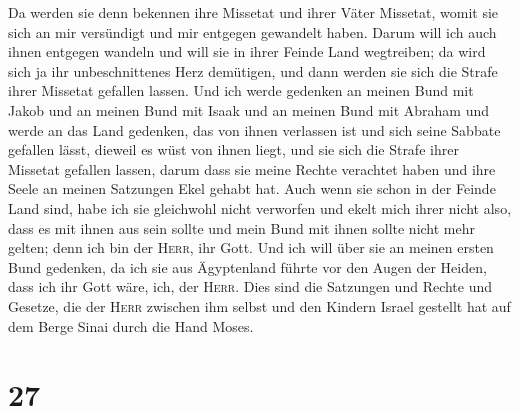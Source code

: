  Da werden sie denn bekennen ihre Missetat und ihrer
Väter Missetat, womit sie sich an mir versündigt und mir entgegen
gewandelt haben.  Darum will ich auch ihnen entgegen
wandeln und will sie in ihrer Feinde Land wegtreiben; da wird sich ja
ihr unbeschnittenes Herz demütigen, und dann werden sie sich die Strafe
ihrer Missetat gefallen lassen.  Und ich werde gedenken
an meinen Bund mit Jakob und an meinen Bund mit Isaak und an meinen Bund
mit Abraham und werde an das Land gedenken,  das von
ihnen verlassen ist und sich seine Sabbate gefallen lässt, dieweil es
wüst von ihnen liegt, und sie sich die Strafe ihrer Missetat gefallen
lassen, darum dass sie meine Rechte verachtet haben und ihre Seele an
meinen Satzungen Ekel gehabt hat.  Auch wenn sie schon in
der Feinde Land sind, habe ich sie gleichwohl nicht verworfen und ekelt
mich ihrer nicht also, dass es mit ihnen aus sein sollte und mein Bund
mit ihnen sollte nicht mehr gelten; denn ich bin der \textsc{Herr}, ihr
Gott.  Und ich will über sie an meinen ersten Bund
gedenken, da ich sie aus Ägyptenland führte vor den Augen der Heiden,
dass ich ihr Gott wäre, ich, der \textsc{Herr}.  Dies
sind die Satzungen und Rechte und Gesetze, die der \textsc{Herr}
zwischen ihm selbst und den Kindern Israel gestellt hat auf dem Berge
Sinai durch die Hand Moses.

\hypertarget{section-26}{%
\section{27}\label{section-26}}

